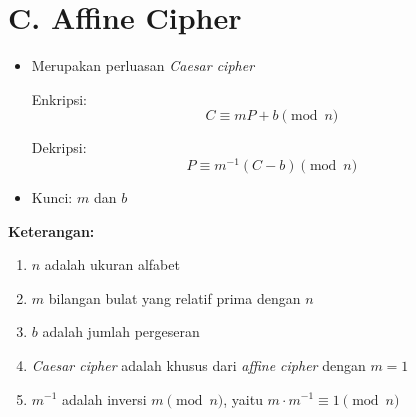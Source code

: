 \documentclass{article}
\begin{document}

\section*{C. Affine Cipher}

\begin{itemize}
    \item Merupakan perluasan \textit{Caesar cipher}
    
    Enkripsi: \[ C \equiv mP + b \pmod{n} \]
    
    Dekripsi: \[ P \equiv m^{-1} (C - b) \pmod{n} \]
    
    \item Kunci: $m$ dan $b$
\end{itemize}

\textbf{Keterangan:}

\begin{enumerate}
    \item $n$ adalah ukuran alfabet
    \item $m$ bilangan bulat yang relatif prima dengan $n$
    \item $b$ adalah jumlah pergeseran
    \item \textit{Caesar cipher} adalah khusus dari \textit{affine cipher} dengan $m = 1$
    \item $m^{-1}$ adalah inversi $m \pmod{n}$, yaitu $m \cdot m^{-1} \equiv 1 \pmod{n}$
\end{enumerate}
\end{document}
